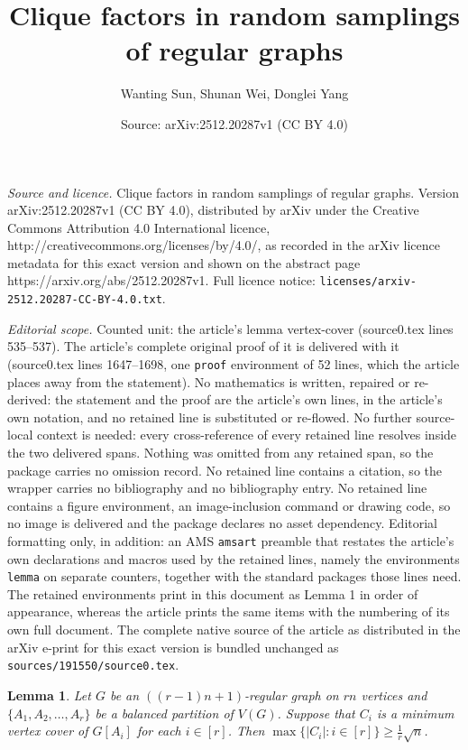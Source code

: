 \documentclass[10pt,a4paper]{amsart}
\title{Clique factors in random samplings of regular graphs}
\author{Wanting Sun, Shunan Wei, Donglei Yang}
\date{Source: arXiv:2512.20287v1 (CC BY 4.0)}
\newtheorem{lemma}{Lemma}
\begin{document}
\maketitle

\noindent\emph{Source and licence.} Clique factors in random samplings of regular graphs. Version arXiv:2512.20287v1 (CC BY 4.0), distributed by arXiv under the Creative Commons Attribution 4.0 International licence, http://creativecommons.org/licenses/by/4.0/, as recorded in the arXiv licence metadata for this exact version and shown on the abstract page https://arxiv.org/abs/2512.20287v1. Full licence notice: \texttt{licenses/arxiv-2512.20287-CC-BY-4.0.txt}.\par\smallskip

\noindent\textit{Editorial scope.} Counted unit: the article's lemma vertex-cover (source0.tex lines 535--537). The article's complete original proof of it is delivered with it (source0.tex lines 1647--1698, one \texttt{proof} environment of 52 lines, which the article places away from the statement). No mathematics is written, repaired or re-derived: the statement and the proof are the article's own lines, in the article's own notation, and no retained line is substituted or re-flowed.  No further source-local context is needed: every cross-reference of every retained line resolves inside the two delivered spans.  Nothing was omitted from any retained span, so the package carries no omission record.  No retained line contains a citation, so the wrapper carries no bibliography and no bibliography entry.  No retained line contains a figure environment, an image-inclusion command or drawing code, so no image is delivered and the package declares no asset dependency.  Editorial formatting only, in addition: an AMS \texttt{amsart} preamble that restates the article's own declarations and macros used by the retained lines, namely the environments \texttt{lemma} on separate counters, together with the standard packages those lines need.  The retained environments print in this document as Lemma 1 in order of appearance, whereas the article prints the same items with the numbering of its own full document.  The complete native source of the article as distributed in the arXiv e-print for this exact version is bundled unchanged as \texttt{sources/191550/source0.tex}.
\begin{lemma}\label{vertex-cover}
Let $G$ be an $((r-1)n+1)$-regular graph on $rn$ vertices and $\{A_1,A_2,\ldots,A_r\}$ be a balanced partition of $V(G)$. Suppose that $C_i$ is a minimum vertex cover of $G[A_i]$ for each $i\in [r]$. Then $\max\{|C_i|:i\in [r]\}\geq \frac{1}{r}\sqrt{n}$.
\end{lemma}
\end{document}
